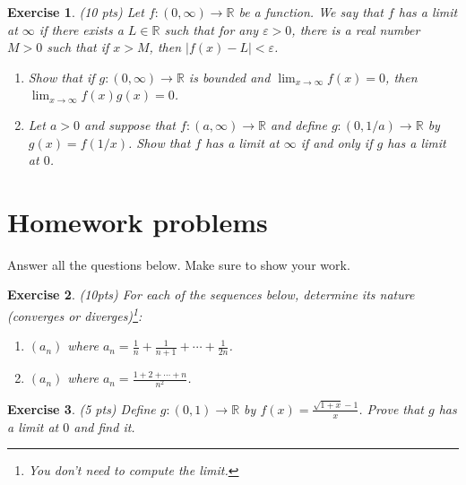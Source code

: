 \documentclass[12pt]{article}
\newcommand{\bR}{\mathbb{R}}
\newcommand{\ra}{\rightarrow}
\theoremstyle{plain}
\newtheorem{exer}{\textbf{Exercise}}}
\theoremstyle{plain}
\begin{document}
\begin{exer}
(10 pts)
Let $f : (0, \infty ) \ra \bR$ be a function. We say that $f$ has a limit at $\infty$ if there exists a $L \in \bR$ such that for any $\varepsilon > 0$, there is a real number $M > 0$ such that if $x > M$, then $|f(x) - L| < \varepsilon$. 
	\begin{enumerate}[label=\textbf{\alph*)}]
	\item Show that if $g: (0, \infty ) \ra \bR$ is bounded and $\lim_{x \ra \infty} f(x ) = 0$, then $\lim_{x \ra \infty} f(x) g(x) = 0$.
	\item Let $a > 0$ and suppose that $f: (a, \infty ) \ra \bR$ and define $g : (0, 1/a ) \ra \bR$ by $g(x) = f(1/x)$. Show that $f$ has a limit at $\infty$ if and only if $g$ has a limit at $0$.
	\end{enumerate}
\end{exer}



\section{Homework problems}
Answer all the questions below. Make sure to show your work.

\begin{exer}
(10pts)
For each of the sequences below, determine its nature (converges or diverges)\footnote{You don't need to compute the limit.}:
	\begin{enumerate}[label=\textbf{\alph*)}]
	\item $(a_n)$ where $a_n = \frac{1}{n} + \frac{1}{n + 1} + \cdots + \frac{1}{2n}$.
	\item $(a_n)$ where $a_n = \frac{1 + 2 + \cdots + n}{n^2}$.
	\end{enumerate}
\end{exer}


\begin{exer}
(5 pts)
Define $g: (0, 1) \ra \bR$ by $f(x) = \frac{\sqrt{1 + x} - 1}{x}$. Prove that $g$ has a limit at $0$ and find it.
\end{exer}
\end{document}
